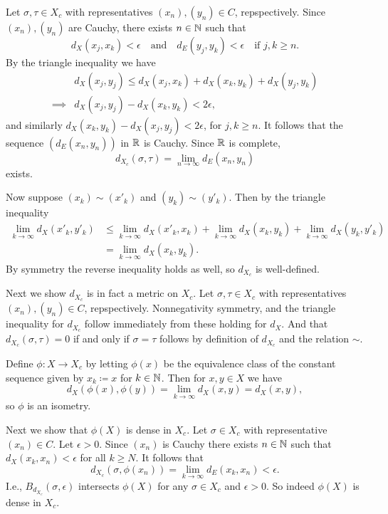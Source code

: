 \begin{nothing}
  Let $\sigma, \tau \in X_c$ with representatives $(x_n),(y_n) \in C$,
  repspectively. Since $(x_n),(y_n)$ are Cauchy, there exists $n \in
  \mathbb{N}$ such that
  \[
  d_X(x_j,x_k) < \epsilon \quad\text{and}\quad d_E(y_j,y_k) < \epsilon
  \quad\text{if } j,k \ge n.
  \]
  By the triangle inequality we have
  \begin{align*}
  &d_X(x_j,y_j) \le d_X(x_j,x_k) + d_X(x_k,y_k) + d_X(y_j,y_k)
    \\ \implies &d_X(x_j,y_j) - d_X(x_k,y_k) < 2\epsilon,
  \end{align*}
  and similarly $d_X(x_k,y_k) - d_X(x_j,y_j) < 2\epsilon$, for $j,k
  \ge n$.  It follows that the sequence $(d_E(x_n,y_n))$ in $\mathbb{R}$ is
  Cauchy. Since $\mathbb{R}$ is complete,
  \[
  d_{X_c}(\sigma, \tau) = \lim_{n \to \infty} d_E(x_n,y_n)
  \]
  exists.

  Now suppose $(x_k) \sim (x'_k)$ and $(y_k) \sim (y'_k)$. Then by the
  triangle inequality
  \begin{align*}
    \lim_{k \to \infty} d_X(x'_k, y'_k) &\le \lim_{k \to \infty}
    d_X(x'_k, x_k) + \lim_{k \to \infty} d_X(x_k, y_k) + \lim_{k \to
      \infty} d_X(y_k, y'_k) \\ &= \lim_{k \to \infty} d_X(x_k, y_k).
  \end{align*}
  By symmetry the reverse inequality holds as well, so $d_{X_c}$ is
  well-defined.
\end{nothing}

\begin{nothing}
  Next we show $d_{X_c}$ is in fact a metric on $X_c$. Let
  $\sigma,\tau \in X_c$ with representatives $(x_n),(y_n) \in C$,
  repspectively. Nonnegativity symmetry, and the triangle inequality
  for $d_{X_c}$ follow immediately from these holding for $d_X$. And
  that $d_{X_c}(\sigma, \tau) = 0$ if and only if $\sigma = \tau$
  follows by definition of $d_{X_c}$ and the relation $\sim$.
\end{nothing}

\begin{nothing}
  Define $\phi : X \to X_c$ by letting $\phi(x)$ be the equivalence
  class of the constant sequence given by $x_k \coloneqq x$ for $k \in
  \mathbb{N}$. Then for $x,y \in X$ we have
  \[
  d_X(\phi(x),\phi(y)) = \lim_{k \to \infty} d_X(x,y) = d_X(x,y),
  \]
  so $\phi$ is an isometry.

  Next we show that $\phi(X)$ is dense in $X_c$. Let $\sigma \in X_c$
  with representative $(x_n) \in C$. Let $\epsilon > 0$. Since $(x_n)$
  is Cauchy there exists $n \in \mathbb{N}$ such that $d_X(x_k,x_n) <
  \epsilon$ for all $k \ge N$. It follows that
  \[
  d_{X_c}(\sigma, \phi(x_n)) = \lim_{k \to \infty} d_E(x_k, x_n) <
  \epsilon.
  \]
  I.e., $B_{d_{X_c}}(\sigma, \epsilon)$ intersects $\phi(X)$ for any
  $\sigma \in X_c$ and $\epsilon > 0$. So indeed $\phi(X)$ is dense in
  $X_c$.
\end{nothing}

